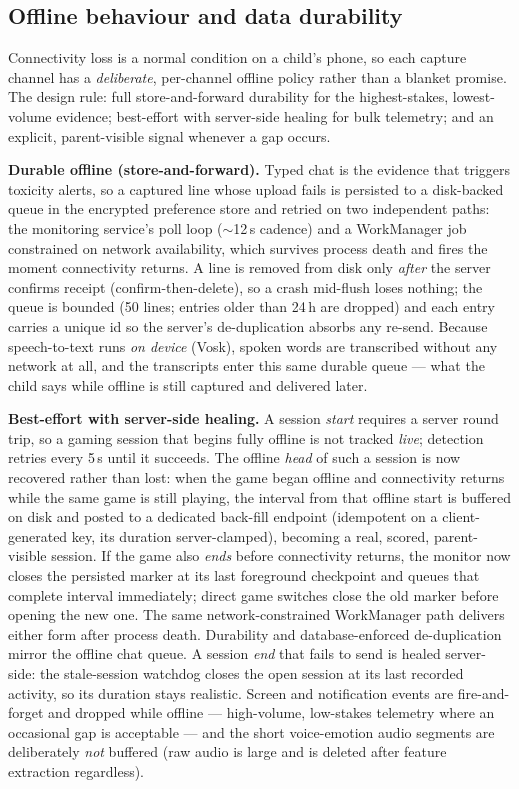 \documentclass[11pt,a4paper]{article}
\begin{document}
\subsection{Offline behaviour and data durability}
Connectivity loss is a normal condition on a child's phone, so each capture channel has
a \emph{deliberate}, per-channel offline policy rather than a blanket promise. The design
rule: full store-and-forward durability for the highest-stakes, lowest-volume evidence;
best-effort with server-side healing for bulk telemetry; and an explicit, parent-visible
signal whenever a gap occurs.

\textbf{Durable offline (store-and-forward).} Typed chat is the evidence that triggers
toxicity alerts, so a captured line whose upload fails is persisted to a disk-backed
queue in the encrypted preference store and retried on two independent paths: the
monitoring service's poll loop ($\sim$12\,s cadence) and a WorkManager job constrained on
network availability, which survives process death and fires the moment connectivity
returns. A line is removed from disk only \emph{after} the server confirms receipt
(confirm-then-delete), so a crash mid-flush loses nothing; the queue is bounded (50
lines; entries older than 24\,h are dropped) and each entry carries a unique id so the
server's de-duplication absorbs any re-send. Because speech-to-text runs \emph{on
device} (Vosk), spoken words are transcribed without any network at all, and the
transcripts enter this same durable queue --- what the child says while offline is still
captured and delivered later.

\textbf{Best-effort with server-side healing.} A session \emph{start} requires a server
round trip, so a gaming session that begins fully offline is not tracked \emph{live};
detection retries every 5\,s until it succeeds. The offline \emph{head} of such a
session is now recovered rather than lost: when the game began offline and connectivity
returns while the same game is still playing, the interval from that offline start is
buffered on disk and posted to a dedicated back-fill endpoint (idempotent on a
client-generated key, its duration server-clamped), becoming a real, scored,
parent-visible session. If the game also \emph{ends} before connectivity returns, the
monitor now closes the persisted marker at its last foreground checkpoint and queues
that complete interval immediately; direct game switches close the old marker before
opening the new one. The same network-constrained WorkManager path delivers either form
after process death. Durability and database-enforced de-duplication mirror the offline
chat queue.
A session \emph{end} that fails to send is healed server-side: the stale-session
watchdog closes the open session at its last recorded activity, so its duration stays
realistic. Screen
and notification events are fire-and-forget and dropped while offline --- high-volume,
low-stakes telemetry where an occasional gap is acceptable --- and the short
voice-emotion audio segments are deliberately \emph{not} buffered (raw audio is large and
is deleted after feature extraction regardless).
\end{document}
